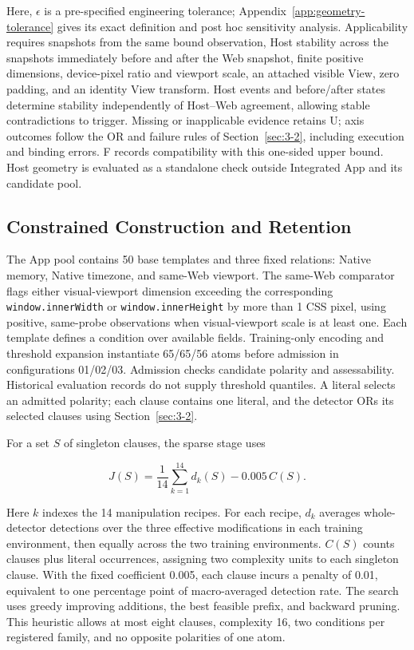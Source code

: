 Here, \(\epsilon\) is a pre-specified engineering tolerance; Appendix~\ref{app:geometry-tolerance} gives its exact definition and post hoc sensitivity analysis. Applicability requires snapshots from the same bound observation, Host stability across the snapshots immediately before and after the Web snapshot, finite positive dimensions, device-pixel ratio and viewport scale, an attached visible View, zero padding, and an identity View transform. Host events and before/after states determine stability independently of Host--Web agreement, allowing stable contradictions to trigger. Missing or inapplicable evidence retains U; axis outcomes follow the OR and failure rules of Section~\ref{sec:3-2}, including execution and binding errors. F records compatibility with this one-sided upper bound. Host geometry is evaluated as a standalone check outside Integrated App and its candidate pool.

\hypertarget{sec:3-4}{%
\subsection{Constrained Construction and Retention}\label{sec:3-4}}

The App pool contains 50 base templates and three fixed relations: Native memory, Native timezone, and same-Web viewport. The same-Web comparator flags either visual-viewport dimension exceeding the corresponding \texttt{window.innerWidth} or \texttt{window.innerHeight} by more than 1 CSS pixel, using positive, same-probe observations when visual-viewport scale is at least one. Each template defines a condition over available fields. Training-only encoding and threshold expansion instantiate 65/65/56 atoms before admission in configurations 01/02/03. Admission checks candidate polarity and assessability. Historical evaluation records do not supply threshold quantiles. A literal selects an admitted polarity; each clause contains one literal, and the detector ORs its selected clauses using Section~\ref{sec:3-2}.

For a set \(S\) of singleton clauses, the sparse stage uses

\[J(S)=\frac{1}{14}\sum_{k=1}^{14}d_k(S)-0.005\,C(S).\]

Here \(k\) indexes the 14 manipulation recipes. For each recipe, \(d_k\) averages whole-detector detections over the three effective modifications in each training environment, then equally across the two training environments. \(C(S)\) counts clauses plus literal occurrences, assigning two complexity units to each singleton clause. With the fixed coefficient 0.005, each clause incurs a penalty of 0.01, equivalent to one percentage point of macro-averaged detection rate. The search uses greedy improving additions, the best feasible prefix, and backward pruning. This heuristic allows at most eight clauses, complexity 16, two conditions per registered family, and no opposite polarities of one atom.

